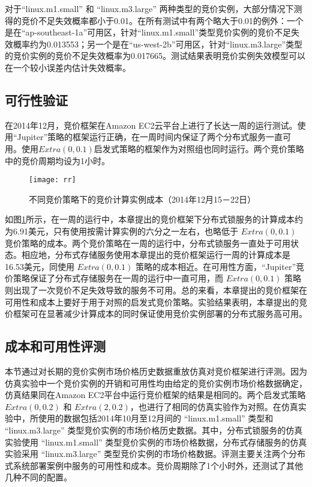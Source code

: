 对于``linux.m1.small'' 和 ``linux.m3.large'' 两种类型的竞价实例，大部分情况下测得的竞价不足失效概率都小于0.01。在所有测试中有两个略大于0.01的例外：一个是在``ap-southeast-1a''可用区，针对``linux.m1.small''类型竞价实例的竞价不足失效概率约为0.013553；另一个是在``us-west-2b''可用区，针对``linux.m3.large''类型的竞价实例的竞价不足失效概率为0.017665。测试结果表明竞价实例失效模型可以在一个较小误差内估计失效概率。

\subsection{可行性验证}
在2014年12月，竞价框架在Amazon EC2云平台上进行了长达一周的运行测试。使用``Jupiter''策略的框架运行正确，在一周时间内保证了两个分布式服务一直可用。使用$Extra(0, 0.1)$启发式策略的框架作为对照组也同时运行。两个竞价策略中的竞价周期均设为1小时。
\begin{figure}
  \centering
  \texttt{[image: rr]}
  \caption{不同竞价策略下的竞价计算实例成本（2014年12月15－22日）}
  \label{figure:rr}
\end{figure}

如图\ref{figure:rr}所示，在一周的运行中，本章提出的竞价框架下分布式锁服务的计算成本约为6.91美元，只有使用按需计算实例的六分之一左右，也略低于 $Extra(0, 0.1)$ 竞价策略的成本。两个竞价策略在一周的运行中，分布式锁服务一直处于可用状态。相应地，分布式存储服务使用本章提出的竞价框架运行一周的计算成本是16.53美元，同使用 $Extra(0, 0.1)$ 策略的成本相近。在可用性方面，``Jupiter''竞价策略保证了分布式存储服务在一周的运行中一直可用，而 $Extra(0, 0.1)$ 策略则出现了一次竞价不足失效导致的服务不可用。总的来看，本章提出的竞价框架在可用性和成本上要好于用于对照的启发式竞价策略。实验结果表明，本章提出的竞价框架可在显著减少计算成本的同时保证使用竞价实例部署的分布式服务高可用。

\subsection{成本和可用性评测}
\label{subsec:ca}
本节通过对长期的竞价实例市场价格历史数据重放仿真对竞价框架进行评测。因为仿真实验中一个竞价实例的开销和可用性均由给定的竞价实例市场价格数据确定，仿真结果同在Amazon EC2平台中运行竞价框架的结果是相同的。两个启发式策略 $Extra(0, 0.2)$ 和 $Extra(2, 0.2)$，也进行了相同的仿真实验作为对照。在仿真实验中，所使用的数据包括2014年10月至12月间的 ``linux.m1.small'' 类型和 ``linux.m3.large'' 类型竞价实例的市场价格历史数据。其中，分布式锁服务的仿真实验使用 ``linux.m1.small'' 类型竞价实例的市场价格数据，分布式存储服务的仿真实验采用 ``linux.m3.large'' 类型竞价实例的市场价格数据。评测主要关注两个分布式系统部署案例中服务的可用性和成本。竞价周期除了1个小时外，还测试了其他几种不同的配置。

